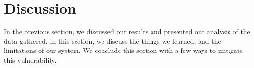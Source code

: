 \section{Discussion}
    In the previous section, we discussed our results and presented our analysis of the data gathered. In this section, we discuss the things we learned, and the limitations of our system. We conclude this section with a few ways to mitigate this vulnerability.




